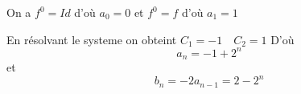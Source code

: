 \documentclass[a4paper, 11pt,reqno]{article}
\begin{document}
\begin{correction}
\begin{enumerate}
\begin{enumerate}
On a $f^0 = Id$ d'où $a_0 =0$ et 
$f^0 = f$ d'où $a_1= 1$

En résolvant le systeme on obteint 
$C_1= -1 \quad C_2=1$
D'où 
$$a_n =-1 +2^n$$
et $$b_n = -2a_{n-1} =2 -2^{n}$$
 
 \end{enumerate}
 \end{enumerate}
\end{correction}
\end{document}

